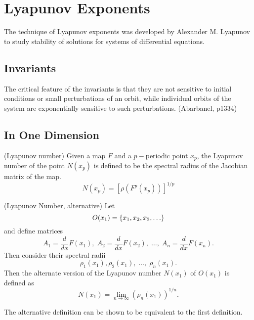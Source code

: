 \documentclass[11pt]{article}
\begin{document}
\section{Lyapunov Exponents}
The technique of Lyapunov exponents was developed by Alexander M. Lyapunov
to study stability of solutions for systems of differential equations.

\subsection{Invariants}
The critical feature of the invariants is that they are not sensitive to initial conditions
or small perturbations of an orbit, while individual orbits of the system are exponentially
sensitive to such perturbations. (Abarbanel, p1334)
\subsection{In One Dimension}
\begin{definition}
  (Lyapunov number)
  Given a map $F$ and a $p-$periodic point $x_p$, the Lyapunov number of the point $N(x_p)$ is
  defined to be the spectral radius of the Jacobian matrix of the map.
  \begin{equation*}
    N(x_p) = \left[ \rho\left( F^p(x_p) \right) \right]^{1/p}
  \end{equation*}
  \label{def:lyapnum}
\end{definition}

\begin{definition}
  (Lyapunov Number, alternative)
  Let
  \begin{equation*}
    O(x_1) = \{x_1, x_2, x_3, \ldots\}
  \end{equation*}
  and define matrices
  \begin{equation*}
    A_1 = \frac{d}{dx}F(x_1),\; A_2 = \frac{d}{dx}F(x_2),\; \ldots,\; A_n = \frac{d}{dx}F(x_n).
  \end{equation*}
  Then consider their spectral radii
  \begin{equation*}
    \rho_1(x_1), \rho_2(x_1),\; \ldots,\; \rho_n(x_1).
  \end{equation*}
  Then the alternate version of the Lyapunov number $N(x_1)$ of $O(x_1)$ is defined as 
  \begin{equation*}
    N(x_1) = \lim\limits_{n \to \infty} (\rho_n(x_1))^{1/n}.
  \end{equation*}
\end{definition}
The alternative definition can be shown to be equivalent to the first definition.
\end{document}
